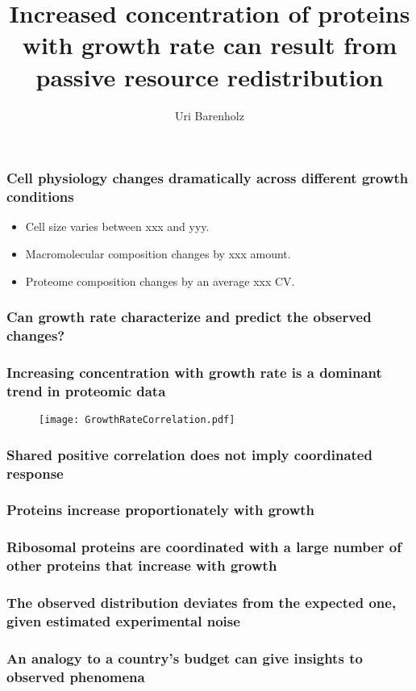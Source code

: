 \documentclass[mathserif]{beamer}
\title{Increased concentration of proteins with growth rate can result from passive resource redistribution}
\author{Uri Barenholz}
\begin{document}
\maketitle
\begin{frame}
\frametitle{Cell physiology changes dramatically across different growth conditions}
\begin{itemize}
\item Cell size varies between xxx and yyy.
\item Macromolecular composition changes by xxx amount.
\item Proteome composition changes by an average xxx CV.
\end{itemize}
\end{frame}

\begin{frame}
\frametitle{Can growth rate characterize and predict the observed changes?}
\end{frame}

\begin{frame}
\frametitle{Increasing concentration with growth rate is a dominant trend in proteomic data}
\begin{figure}[h!]
\centering
\texttt{[image: GrowthRateCorrelation.pdf]}
\end{figure}
\end{frame}

\begin{frame}
\frametitle{Shared positive correlation does not imply coordinated response}
\end{frame}

\begin{frame}
\frametitle{Proteins increase proportionately with growth}
\end{frame}

\begin{frame}
\frametitle{Ribosomal proteins are coordinated with a large number of other proteins that increase with growth}
\end{frame}

\begin{frame}
\frametitle{The observed distribution deviates from the expected one, given estimated experimental noise}
\end{frame}

\begin{frame}
\frametitle{An analogy to a country's budget can give insights to observed phenomena}
\end{frame}
\end{document}
